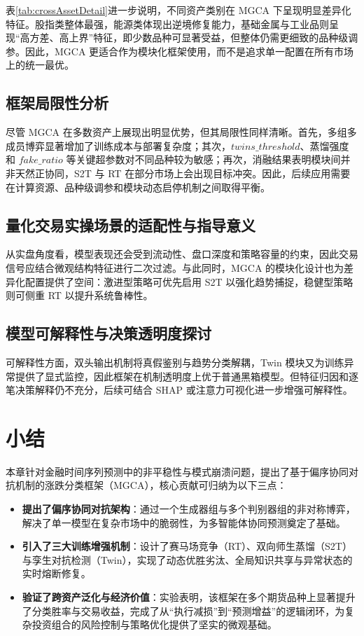 表\ref{tab:crossAssetDetail}进一步说明，不同资产类别在 MGCA 下呈现明显差异化特征。股指类整体最强，能源类体现出逆境修复能力，基础金属与工业品则呈现“高方差、高上界”特征，即少数品种可显著受益，但整体仍需更细致的品种级调参。因此，MGCA 更适合作为模块化框架使用，而不是追求单一配置在所有市场上的统一最优。

\subsection{框架局限性分析}
尽管 MGCA 在多数资产上展现出明显优势，但其局限性同样清晰。首先，多组多成员博弈显著增加了训练成本与部署复杂度；其次，$twins\_threshold$、蒸馏强度和 $fake\_ratio$ 等关键超参数对不同品种较为敏感；再次，消融结果表明模块间并非天然正协同，S2T 与 RT 在部分市场上会出现目标冲突。因此，后续应用需要在计算资源、品种级调参和模块动态启停机制之间取得平衡。

\subsection{量化交易实操场景的适配性与指导意义}
从实盘角度看，模型表现还会受到流动性、盘口深度和策略容量的约束，因此交易信号应结合微观结构特征进行二次过滤。与此同时，MGCA 的模块化设计也为差异化配置提供了空间：激进型策略可优先启用 S2T 以强化趋势捕捉，稳健型策略则可侧重 RT 以提升系统鲁棒性。

\subsection{模型可解释性与决策透明度探讨}
可解释性方面，双头输出机制将真假鉴别与趋势分类解耦，Twin 模块又为训练异常提供了显式监控，因此框架在机制透明度上优于普通黑箱模型。但特征归因和逐笔决策解释仍不充分，后续可结合 SHAP 或注意力可视化进一步增强可解释性。

\section{小结}
本章针对金融时间序列预测中的非平稳性与模式崩溃问题，提出了基于偏序协同对抗机制的涨跌分类框架（MGCA），核心贡献可归纳为以下三点：
\begin{itemize}
    \item \textbf{提出了偏序协同对抗架构}：通过一个生成器组与多个判别器组的非对称博弈，解决了单一模型在复杂市场中的脆弱性，为多智能体协同预测奠定了基础。
    \item \textbf{引入了三大训练增强机制}：设计了赛马场竞争（RT）、双向师生蒸馏（S2T）与孪生对抗检测（Twin），实现了动态优胜劣汰、全局知识共享与异常状态的实时熔断修复。
    \item \textbf{验证了跨资产泛化与经济价值}：实验表明，该框架在多个期货品种上显著提升了分类胜率与交易收益，完成了从“执行减损”到“预测增益”的逻辑闭环，为复杂投资组合的风险控制与策略优化提供了坚实的微观基础。
\end{itemize}

